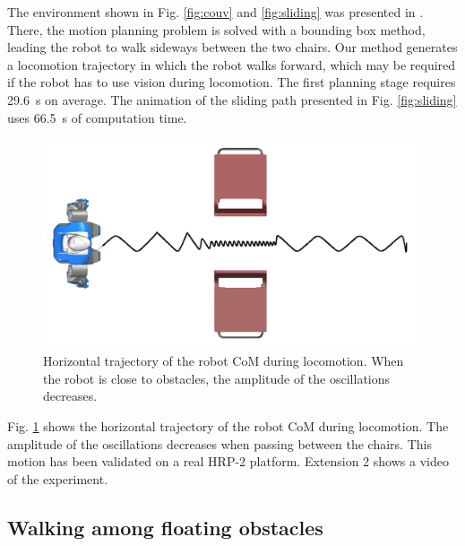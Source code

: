 \documentclass{article}
\begin{document}
The environment shown in Fig. \ref{fig:couv} and \ref{fig:sliding} was presented
in \cite{el2011path}. There, the motion planning problem is solved with a bounding
box method, leading the robot to walk sideways between the two chairs.
Our method generates a locomotion  trajectory in which the robot walks
forward, which may be required if the robot has to use vision during
locomotion. The first planning stage  requires 29.6~s
on  average.   The  animation  of   the  sliding  path   presented  in
Fig.   \ref{fig:sliding}   uses  66.5~s  of  computation   time.


\begin{figure}[h!]
\centering
\includegraphics[width=0.7\linewidth]{pics/chairs/waist-trajectory.png}

\caption{Horizontal trajectory of the robot CoM during
  locomotion. When the robot is close to obstacles, the amplitude of
  the oscillations decreases.}
\label{fig:chairs-waist}
\end{figure}



Fig.  \ref{fig:chairs-waist} shows  the horizontal  trajectory  of the
robot CoM  during  locomotion. The amplitude of the oscillations  decreases when passing
between the  chairs.  This motion has  been validated on  a real HRP-2
platform. Extension 2 shows a video of the experiment.


\subsection{Walking among floating obstacles}
\end{document}
